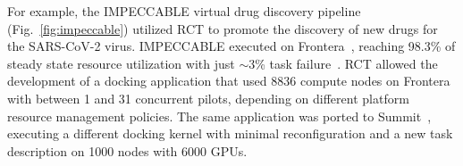 \documentclass[preprint,12pt, a4paper]{elsarticle}
\begin{document}

For example, the IMPECCABLE virtual drug discovery
pipeline~\cite{saadi2021impeccable} (Fig.~\ref{fig:impeccable}) utilized RCT to
promote the discovery of new drugs for the SARS-CoV-2 virus. IMPECCABLE executed
on Frontera~\cite{stanzione2020frontera},
reaching 98.3\% of steady state resource utilization with just $\sim$3\% task
failure~\cite{merzky2022raptor}. RCT allowed the development of a docking
application that used 8836 compute nodes on Frontera with between 1 and 31
concurrent pilots, depending on different platform resource management
policies. The same application was ported to Summit~\cite{luo2020pre},
executing a different docking kernel with minimal reconfiguration and a new
task description on 1000 nodes with 6000 GPUs.



\end{document}
